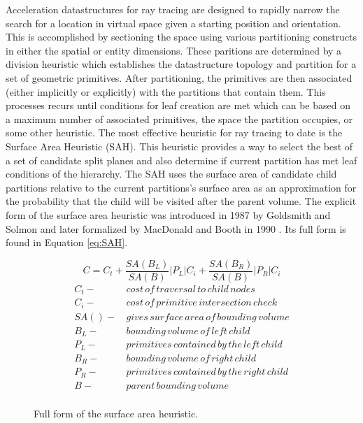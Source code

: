 \documentclass[12pt, a4paper]{article}
\begin{document}
Acceleration datastructures for ray tracing are designed to rapidly narrow the search for a location in virtual space given a starting position and orientation. This is accomplished by sectioning the space using various partitioning constructs in either the spatial or entity dimensions. These paritions are determined by a division heuristic which establishes the datastructure topology and partition for a set of geometric primitives. After partitioning, the primitives are then associated (either implicitly or explicitly) with the partitions that contain them. This processes recurs until conditions for leaf creation are met which can be based on a maximum number of associated primitives, the space the partition occupies, or some other heuristic. The most effective heuristic for ray tracing to date is the Surface Area Heuristic (SAH). This heuristic provides a way to select the best of a set of candidate split planes and also determine if current partition has met leaf conditions of the hierarchy. The SAH uses the surface area of candidate child partitions relative to the current partitions's surface area as an approximation for the probability that the child will be visited after the parent volume. The explicit form of the surface area heuristic was introduced in 1987 by Goldsmith and Solmon \cite{Goldsmith_1987} and later formalized by MacDonald and Booth in 1990 \cite{MacDonald_1990}. Its full form is found in Equation \ref{eq:SAH}.


\begin{figure}[H]
  \begin{equation}
    C =  C_{t} + \frac{SA(B_{L})}{SA(B)} |P_{L}|C_{i} +  \frac{SA(B_{R})}{SA(B)} |P_{R}|C_{i}
    \label{eq:SAH}
  \end{equation}
  \begin{align*}
    C_{t} - & \,cost\, of\, traversal\, to\, child\, nodes \\
    C_{i} - & \, cost\, of\, primitive\, intersection\, check\, \\
    SA() - & \, gives\, surface\, area\, of\, bounding\, volume \\
    B_{L} - &  \, bounding\, volume\, of\, left\, child \\
    P_{L} - & \, primitives\, contained\, by\, the\, left\, child  \\
    B_{R} - & \, bounding\, volume\, of\, right\, child \\
    P_{R} - & \, primitives\, contained\, by\, the\, right\, child \\
    B - & \, parent\, bounding\, volume \\
  \end{align*}
  \caption{Full form of the surface area heuristic.}
  \label{fig:SAH}
\end{figure}
\end{document}
